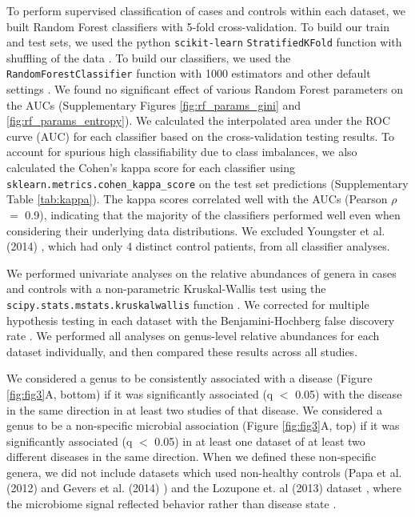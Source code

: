{To perform supervised classification of cases and controls within each dataset, we built Random Forest classifiers with 5-fold cross-validation.
To build our train and test sets, we used the python \texttt{scikit-learn} \texttt{StratifiedKFold} function with shuffling of the data \cite{scikit-learn}.
To build our classifiers, we used the \texttt{RandomForestClassifier} function with 1000 estimators and other default settings \cite{scikit-learn}.
We found no significant effect of various Random Forest parameters on the AUCs  (Supplementary Figures \ref{fig:rf_params_gini} and \ref{fig:rf_params_entropy}).
We calculated the interpolated area under the ROC curve (AUC) for each classifier based on the cross-validation testing results.
To account for spurious high classifiability due to class imbalances, we also calculated the Cohen's kappa score for each classifier using \texttt{sklearn.metrics.cohen\_kappa\_score} on the test set predictions (Supplementary Table \ref{tab:kappa}).
The kappa scores correlated well with the AUCs (Pearson $\rho$ $=$ 0.9), indicating that the majority of the classifiers performed well even when considering their underlying data distributions.
We excluded Youngster et al. (2014) \cite{cdi-youngster}, which had only 4 distinct control patients, from all classifier analyses.

We performed univariate analyses on the relative abundances of genera in cases and controls with a non-parametric Kruskal-Wallis test using the \\ \texttt{scipy.stats.mstats.kruskalwallis} function \cite{scipy}.
We corrected for multiple hypothesis testing in each dataset with the Benjamini-Hochberg false discovery rate \cite{benjamini-hochberg}.
We performed all analyses on genus-level relative abundances for each dataset individually, and then compared these results across all studies.

We considered a genus to be consistently associated with a disease (Figure \ref{fig:fig3}A, bottom) if it was significantly associated (q $<$ 0.05) with the disease in the same direction in at least two studies of that disease.
We considered a genus to be a non-specific microbial association (Figure \ref{fig:fig3}A, top) if it was significantly associated (q $<$ 0.05) in at least one dataset of at least two different diseases in the same direction.
When we defined these non-specific genera, we did not include datasets which used non-healthy controls (Papa et al. (2012) \cite{ibd-papa} and Gevers et al. (2014) \cite{ibd-gevers}) and the Lozupone et. al (2013) dataset \cite{lozupone2013alterations}, where the microbiome signal reflected behavior rather than disease state \cite{noguera2016gut}.

}
